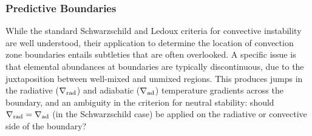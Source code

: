 {\color{brown}
\subsubsection{Predictive Boundaries}}


While the standard Schwarzschild and Ledoux criteria for convective instability are well understood, their application to determine the location of convection zone boundaries entails subtleties that are often overlooked. A specific issue is that elemental abundances at boundaries are typically discontinuous, due to the juxtaposition between well-mixed and unmixed regions. This produces jumps in the radiative ($\nabla_{\rm rad}$) and adiabatic ($\nabla_{\rm ad}$) temperature gradients across the boundary, and an ambiguity in the criterion for neutral stability: should $\nabla_{\rm rad}=\nabla_{\rm ad}$ (in the Schwarzschild case) be applied on the radiative or convective side of the boundary?

